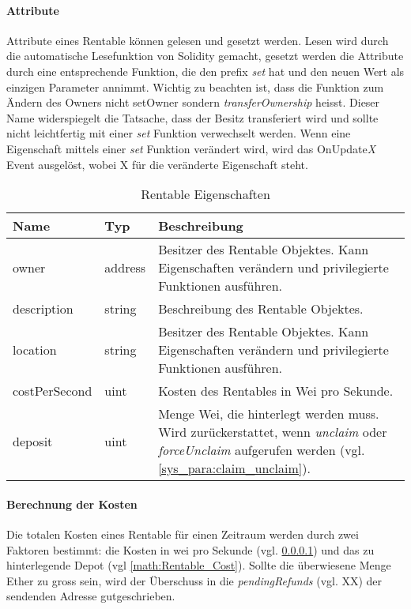\paragraph{Attribute}
\label{sys_para:Rentable_Attribute}
Attribute eines Rentable können gelesen und gesetzt werden. Lesen wird durch die automatische Lesefunktion von Solidity gemacht, gesetzt werden die Attribute durch eine entsprechende Funktion, die den prefix \emph{set} hat und den neuen Wert als einzigen Parameter annimmt. Wichtig zu beachten ist, dass die Funktion zum Ändern des Owners nicht setOwner sondern \emph{transferOwnership} heisst. Dieser Name widerspiegelt die Tatsache, dass der Besitz transferiert wird und sollte nicht leichtfertig mit einer \emph{set} Funktion verwechselt werden. Wenn eine Eigenschaft mittels einer \emph{set} Funktion verändert wird, wird das OnUpdate\emph{X} Event ausgelöst, wobei X für die veränderte Eigenschaft steht. 

\begin{longtable}{@{}llL{9cm}@{}}
\caption{Rentable Eigenschaften}\label{tbl:Rentable_Eigenschaften}\\
\toprule
Name & Typ & Beschreibung \\ \midrule
owner & address   & Besitzer des Rentable Objektes. Kann Eigenschaften verändern und privilegierte Funktionen ausführen.\\
description & string   & Beschreibung des Rentable Objektes.\\
location & string   & Besitzer des Rentable Objektes. Kann Eigenschaften verändern und privilegierte Funktionen ausführen.\\
costPerSecond & uint   & Kosten des Rentables in Wei pro Sekunde.\\
deposit & uint   & Menge Wei, die hinterlegt werden muss. Wird zurückerstattet, wenn \emph{unclaim} oder \emph{forceUnclaim} aufgerufen werden (vgl. \ref{sys_para:claim_unclaim}).\\
\end{longtable}

\paragraph{Berechnung der Kosten}
Die totalen Kosten eines Rentable für einen Zeitraum werden durch zwei Faktoren bestimmt: die Kosten in wei pro Sekunde (vgl. \ref{sys_para:Rentable_Attribute}) und das zu hinterlegende Depot (vgl \ref{math:Rentable_Cost}). Sollte die überwiesene Menge Ether zu gross sein, wird der Überschuss in die \emph{pendingRefunds} (vgl. XX) der sendenden Adresse gutgeschrieben.

